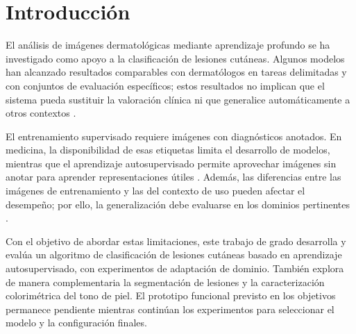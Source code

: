 \chapter{Introducción}



El análisis de imágenes dermatológicas mediante aprendizaje profundo se ha investigado como apoyo a la clasificación de lesiones cutáneas. Algunos modelos han alcanzado resultados comparables con dermatólogos en tareas delimitadas y con conjuntos de evaluación específicos; estos resultados no implican que el sistema pueda sustituir la valoración clínica ni que generalice automáticamente a otros contextos \parencite{esteva2017dermatologist,chaturvedi2020multiclassskin}.

El entrenamiento supervisado requiere imágenes con diagnósticos anotados. En medicina, la disponibilidad de esas etiquetas limita el desarrollo de modelos, mientras que el aprendizaje autosupervisado permite aprovechar imágenes sin anotar para aprender representaciones útiles \parencite{krishnan2022selfsupervisedmedicine,wang2023pymic}. Además, las diferencias entre las imágenes de entrenamiento y las del contexto de uso pueden afectar el desempeño; por ello, la generalización debe evaluarse en los dominios pertinentes \parencite{tschandl2018ham10000,yang2024crosshospital}.


Con el objetivo de abordar estas limitaciones, este trabajo de grado desarrolla y evalúa un algoritmo de clasificación de lesiones cutáneas basado en aprendizaje autosupervisado, con experimentos de adaptación de dominio. También explora de manera complementaria la segmentación de lesiones y la caracterización colorimétrica del tono de piel. El prototipo funcional previsto en los objetivos permanece pendiente mientras continúan los experimentos para seleccionar el modelo y la configuración finales.
